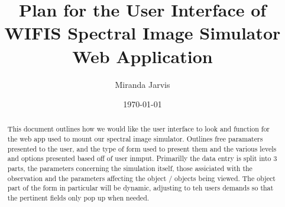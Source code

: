 \documentclass[11pt,twoside]{article}
\title{Plan for the User Interface of WIFIS Spectral Image Simulator Web Application}
\author{Miranda Jarvis}
\date{\today}
\begin{document}
\maketitle

\begin{abstract}
This document outlines how we would like the user interface to look and function for the web app used to mount our spectral image simulator. Outlines free paramaters presented to the user, and the type of form used to present them and the various levels and options presented based off of user inmput. Primarilly the data entry is split into 3 parts, the parameters concerning the simulation itself, those assiciated with the observation and the parameters affecting the object / objects being viewed. The object part of the form in particular will be dynamic, adjusting to teh users demands so that the pertinent fields only pop up when needed.
\end{abstract}
\end{document}
